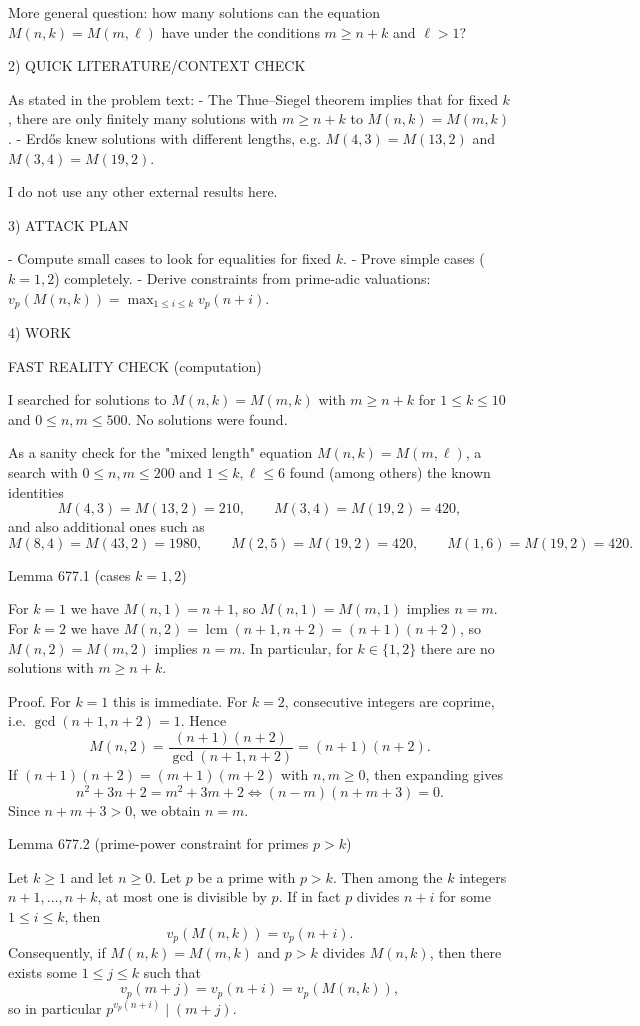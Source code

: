 More general question: how many solutions can the equation $M(n,k)=M(m,\ell)$ have under the conditions $m\ge n+k$ and $\ell>1$?

2) QUICK LITERATURE/CONTEXT CHECK

As stated in the problem text:
- The Thue--Siegel theorem implies that for fixed $k$, there are only finitely many solutions with $m\ge n+k$ to $M(n,k)=M(m,k)$.
- Erd\H{o}s knew solutions with different lengths, e.g. $M(4,3)=M(13,2)$ and $M(3,4)=M(19,2)$.

I do not use any other external results here.

3) ATTACK PLAN

- Compute small cases to look for equalities for fixed $k$.
- Prove simple cases ($k=1,2$) completely.
- Derive constraints from prime-adic valuations: $v_p(M(n,k))=\max_{1\le i\le k} v_p(n+i)$.

4) WORK

FAST REALITY CHECK (computation)

I searched for solutions to $M(n,k)=M(m,k)$ with $m\ge n+k$ for $1\le k\le 10$ and $0\le n,m\le 500$. No solutions were found.

As a sanity check for the "mixed length" equation $M(n,k)=M(m,\ell)$, a search with $0\le n,m\le 200$ and $1\le k,\ell\le 6$ found (among others) the known identities
\[
M(4,3)=M(13,2)=210,\qquad M(3,4)=M(19,2)=420,
\]
and also additional ones such as
\[
M(8,4)=M(43,2)=1980,\qquad M(2,5)=M(19,2)=420,\qquad M(1,6)=M(19,2)=420.
\]

Lemma 677.1 (cases $k=1,2$)

For $k=1$ we have $M(n,1)=n+1$, so $M(n,1)=M(m,1)$ implies $n=m$.
For $k=2$ we have $M(n,2)=\operatorname{lcm}(n+1,n+2)=(n+1)(n+2)$, so $M(n,2)=M(m,2)$ implies $n=m$.
In particular, for $k\in\{1,2\}$ there are no solutions with $m\ge n+k$.

Proof.
For $k=1$ this is immediate.
For $k=2$, consecutive integers are coprime, i.e. $\gcd(n+1,n+2)=1$. Hence
\[
M(n,2)=\frac{(n+1)(n+2)}{\gcd(n+1,n+2)}=(n+1)(n+2).
\]
If $(n+1)(n+2)=(m+1)(m+2)$ with $n,m\ge 0$, then expanding gives
\[
 n^2+3n+2=m^2+3m+2\iff (n-m)(n+m+3)=0.
\]
Since $n+m+3>0$, we obtain $n=m$.


Lemma 677.2 (prime-power constraint for primes $p>k$)

Let $k\ge 1$ and let $n\ge 0$. Let $p$ be a prime with $p>k$. Then among the $k$ integers $n+1,\dots,n+k$, at most one is divisible by $p$.
If in fact $p$ divides $n+i$ for some $1\le i\le k$, then
\[
 v_p(M(n,k))=v_p(n+i).
\]
Consequently, if $M(n,k)=M(m,k)$ and $p>k$ divides $M(n,k)$, then there exists some $1\le j\le k$ such that
\[
 v_p(m+j)=v_p(n+i)=v_p(M(n,k)),
\]
so in particular $p^{v_p(n+i)}\mid (m+j)$.

